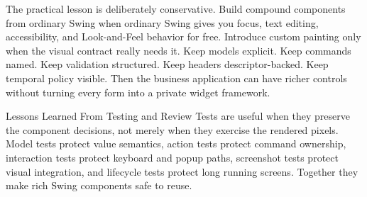 The practical lesson is deliberately conservative. Build compound components from
ordinary Swing when ordinary Swing gives you focus, text editing, accessibility, and
Look-and-Feel behavior for free. Introduce custom painting only when the visual contract
really needs it. Keep models explicit. Keep commands named. Keep validation structured.
Keep headers descriptor-backed. Keep temporal policy visible. Then the business
application can have richer controls without turning every form into a private widget
framework.

\begin{principlebox}{Lessons Learned From Testing and Review}
Tests are useful when they preserve the component decisions, not merely when they
exercise the rendered pixels. Model tests protect value semantics, action tests
protect command ownership, interaction tests protect keyboard and popup paths,
screenshot tests protect visual integration, and lifecycle tests protect long
running screens. Together they make rich Swing components safe to reuse.
\end{principlebox}
